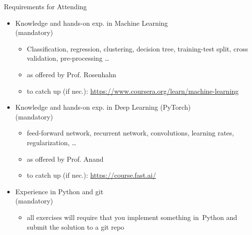 \documentclass[aspectratio=169]{../latex_main/tntbeamer}  %
\begin{document}
\begin{frame}[c]{Requirements for Attending}

\begin{itemize}
  \item Knowledge and hands-on exp. in \alert{Machine Learning}\\ (mandatory)
  \begin{itemize}
    \item Classification, regression, clustering, decision tree, training-test split, cross validation, pre-processing \ldots
    \item as offered by Prof. Rosenhahn
    \item to catch up (if nec.): \url{https://www.coursera.org/learn/machine-learning} 
  \end{itemize}
  \pause
  \item Knowledge and hands-on exp. in \alert{Deep Learning} (PyTorch)\\ (mandatory)
  \begin{itemize}
    \item feed-forward network, recurrent network, convolutions, learning rates, regularization, \ldots 
    \item as offered by Prof. Anand
    \item to catch up (if nec.): \url{https://course.fast.ai/}
  \end{itemize}
  \pause
  \item Experience in \alert{Python and git}\\ (mandatory)
  \begin{itemize}
    \item all exercises will require 
    that you implement something in~Python and\\ submit the solution to a git repo
  \end{itemize}
\end{itemize}

\end{frame}
\end{document}
